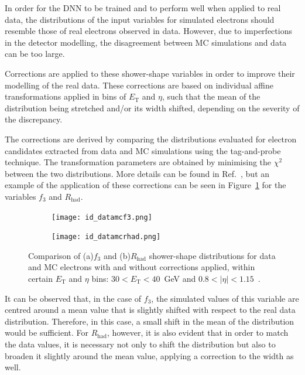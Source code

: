 In order for the DNN to be trained and to perform well when applied to real data, the distributions of the input variables for simulated electrons should resemble those of real electrons observed in data. However, due to imperfections in the detector modelling, the disagreement between MC simulations and data can be too large. %

Corrections are applied to these shower-shape variables in order to improve their modelling of the real data. These corrections are based on individual affine transformations applied in bins of $E_{\text{T}}$ and $\eta$, such that the mean of the distribution being stretched and/or its width shifted, depending on the severity of the discrepancy.

The corrections are derived by comparing the distributions evaluated for \zee electron candidates extracted from data and MC simulations using the tag-and-probe technique. The transformation parameters are obtained by minimising the $\chi^2$ between the two distributions. More details can be found in Ref.~\cite{Aaboud:2657964}, but an example of the application of these corrections can be seen in Figure~\ref{fig:corrected} for the variables $f_{3}$ and $R_{\text{had}}$.


\begin{figure}[htbp]
  \centering
  \begin{subfigure}[b]{0.48\textwidth}
      \texttt{[image: id\_datamcf3.png]}
      \caption{}
  \end{subfigure}
  \hfill
  \begin{subfigure}[b]{0.48\textwidth}
      \texttt{[image: id\_datamcrhad.png]}
      \caption{}
  \end{subfigure}
  \hfill
  \caption{Comparison of (a)$f_{3}$ and (b)$R_{\text{had}}$ shower-shape distributions for data and MC electrons with and without corrections applied, within certain $E_{\text{T}}$ and $\eta$ bins: $30 < E_{\text{T}} < 40$~GeV and $0.8<|\eta|<1.15$~\cite{Aaboud:2657964}.}
  \label{fig:corrected}
\end{figure}

It can be observed that, in the case of $f_3$, the simulated values of this variable are centred around a mean value that is slightly shifted with respect to the real data distribution. Therefore, in this case, a small shift in the mean of the distribution would be sufficient. 
For $R_{\text{had}}$, however, it is also evident that in order to match the data values, it is necessary not only to shift the distribution but also to broaden it slightly around the mean value, applying a correction to the width as well.

